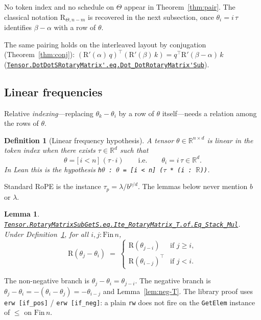 \documentclass[11pt,a4paper]{article}
\newcommand{\lmod}[1]{\href{http://www.lemma.cn/lean/?module=#1}{\nolinkurl{#1}}}
\newtheorem{lemma}[theorem]{Lemma}
\newtheorem{definition}[theorem]{Definition}
\newcommand{\R}{\mathbb{R}}
\newcommand{\rot}{\mathrm{R}}
\begin{document}
No token index and no schedule on \(\Theta\) appear in Theorem~\ref{thm:pair}.
The classical notation \(\rot_{\Theta,n-m}\) is recovered in the next subsection, once \(\theta_i=i\,\tau\) identifies \(\beta-\alpha\) with a row of \(\theta\).

The same pairing holds on the interleaved layout by conjugation (Theorem~\ref{thm:conj}):
\((\rot'(\alpha)\,q)^\top(\rot'(\beta)\,k)=q^\top\rot'(\beta-\alpha)\,k\)
(\lmod{Tensor.DotDotSRotaryMatrix'.eq.Dot_DotRotaryMatrix'Sub}).

\subsection{Linear frequencies}

Relative \emph{indexing}---replacing \(\theta_k-\theta_i\) by a row of \(\theta\) itself---needs a relation among the rows of \(\theta\).

\begin{definition}[Linear frequency hypothesis]
\label{def:lin}
A tensor \(\theta\in\R^{n\times d}\) is linear in the token index when there exists \(\tau\in\R^d\) such that
\begin{equation}
  \theta = \bigl[\,i < n\,\bigr]\;(\tau\cdot i)
  \qquad\text{i.e.}\qquad
  \theta_i = i\,\tau\in\R^d.
\end{equation}
In Lean this is the hypothesis
\texttt{h\(\theta\) : \(\theta\) = [i < n] (\(\tau\) * (i : \(\mathbb{R}\)))}.
\end{definition}

Standard RoPE is the instance
\(\tau_p=\lambda/b^{p/d}\).
The lemmas below never mention \(b\) or \(\lambda\).

\begin{lemma}
\label{lem:ite}
\lmod{Tensor.RotaryMatrixSubGetS.eq.Ite_RotaryMatrix_T.of.Eq_Stack_Mul}.
Under Definition~\ref{def:lin}, for all \(i,j:\mathrm{Fin}\,n\),
\begin{equation}
  \rot(\theta_j-\theta_i)
  \;=\;
  \begin{cases}
    \rot(\theta_{j-i}) & \text{if }j\ge i,\\[0.25em]
    \rot(\theta_{i-j})^\top & \text{if }j<i.
  \end{cases}
\end{equation}
\end{lemma}

The non-negative branch is \(\theta_j-\theta_i=\theta_{j-i}\).
The negative branch is \(\theta_j-\theta_i=-(\theta_i-\theta_j)=-\theta_{i-j}\) and Lemma~\ref{lem:neg-T}.
The library proof uses \texttt{erw [if\_pos]} / \texttt{erw [if\_neg]}: a plain \texttt{rw} does not fire on the \texttt{GetElem} instance of \(\le\) on \(\mathrm{Fin}\,n\).
\end{document}
